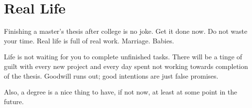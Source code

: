 \chapter{Real Life}
\label{get_it_done}

Finishing a master's thesis after college is no joke.
Get it done now. 
Do not waste your time.
Real life is full of real work. Marriage. Babies.

Life is not waiting for you to complete unfinished tasks.
There will be a tinge of guilt with every new project and every day spent not working towards completion of the thesis.
Goodwill runs out; good intentions are just false promises.

Also, a degree is a nice thing to have, if not now, at least at some point in the future.

